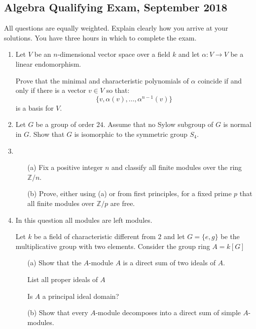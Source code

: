 \documentclass{article}
\begin{document}
\subsection*{Algebra Qualifying Exam, September 2018}

All questions are equally weighted. Explain clearly how you arrive at your solutions. You have three hours in which to complete the exam.

\begin{enumerate}
    \item Let \(V\) be an \(n\)-dimensional vector space over a field \(k\) and let \(\alpha\colon V\to V\) be a linear endomorphism.
    
    Prove that the minimal and characteristic polynomials of \(\alpha\) coincide if and only if there is a vector \(v\in V\) so that:
    \[\{v,\alpha(v),\ldots,\alpha^{n-1}(v)\}\]
    is a basis for \(V\).

    \item Let \(G\) be a group of order \(24\). Assume that no Sylow subgroup of \(G\) is normal in \(G\). Show that \(G\) is isomorphic to the symmetric group \(S_{4}\).

    \item 
    \begin{itemize}
        \item[(a)] Fix a positive integer \(n\) and classify all finite modules over the ring \(\mathbb{Z}/n\).
        \item[(b)] Prove, either using (a) or from first principles, for a fixed prime \(p\) that all finite modules over \(\mathbb{Z}/p\) are free.
    \end{itemize}

    \item In this question all modules are left modules.
    
    Let \(k\) be a field of characteristic different from \(2\) and let \(G=\{e,g\}\) be the multiplicative group with two elements. Consider the group ring \(A=k[G]\)
    \begin{itemize}
        \item[(a)] Show that the \(A\)-module \(A\) is a direct sum of two ideals of \(A\).
        
        List all proper ideals of \(A\)
        
        Is \(A\) a principal ideal domain?
        
        \item[(b)] Show that every \(A\)-module decomposes into a direct sum of simple \(A\)-modules.
        

\end{itemize}
\end{enumerate}
\end{document}
